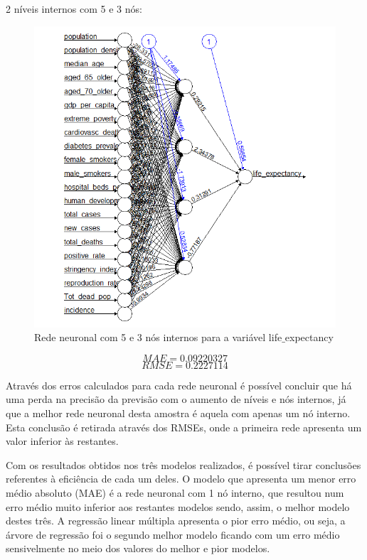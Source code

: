 \documentclass[conference]{IEEEtran}
\begin{document}
2 níveis internos com 5 e 3 nós:
\begin{figure}[htbp]
\centerline{\includegraphics[width=0.95\columnwidth]{images/04_4.png}}
\caption{Rede neuronal com 5 e 3 nós internos para a variável life$\_$expectancy}
\label{4b}
\end{figure}
\begin{equation}
MAE=0.09220327\label{4c3_mae}
\end{equation}
\begin{equation}
RMSE=0.2227114\label{4c3_rmse}
\end{equation}


Através dos erros calculados para cada rede neuronal é possível concluir que há uma perda na precisão da previsão com o aumento de níveis e nós internos, já que a melhor rede neuronal desta amostra é aquela com apenas um nó interno. Esta conclusão é retirada através dos RMSEs, onde a primeira rede apresenta um valor inferior às restantes.

Com os resultados obtidos nos três modelos realizados, é possível tirar conclusões referentes à eficiência de cada um deles. O modelo que apresenta um menor erro médio absoluto (MAE) é a rede neuronal com 1 nó interno, que resultou num erro médio muito inferior aos restantes modelos sendo, assim, o melhor modelo destes três.
A regressão linear múltipla apresenta o pior erro médio, ou seja, a árvore de regressão foi o segundo melhor modelo ficando com um erro médio sensivelmente no meio dos valores do melhor e pior modelos.
\end{document}
